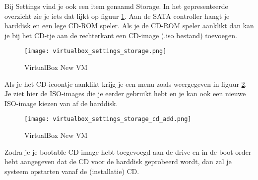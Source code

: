 Bij Settings vind je ook een item genaamd Storage. In het gepresenteerde overzicht zie je iets dat lijkt op figuur \ref{VB_settings_storage}. Aan de SATA controller hangt je harddisk en een lege CD-ROM speler. Als je de CD-ROM speler aanklikt dan kan je bij het CD-tje aan de rechterkant een CD-image (.iso bestand) toevoegen.
\begin{figure}[H]
	\centering
	\texttt{[image: virtualbox\_settings\_storage.png]}
	\caption{VirtualBox New VM}
	\label{VB_settings_storage}
\end{figure}

Als je het CD-icoontje aanklikt krijg je een menu zoals weergegeven in figuur \ref{VB_settings_storage_cd_add}. Je ziet hier de ISO-images die je eerder gebruikt hebt en je kan ook een nieuwe ISO-image kiezen van af de harddisk.
\begin{figure}[H]
	\centering
	\texttt{[image: virtualbox\_settings\_storage\_cd\_add.png]}
	\caption{VirtualBox New VM}
	\label{VB_settings_storage_cd_add}
\end{figure}

Zodra je je bootable CD-image hebt toegevoegd aan de drive en in de boot order hebt aangegeven dat de CD voor de harddisk geprobeerd wordt, dan zal je systeem opstarten vanaf de (installatie) CD.

